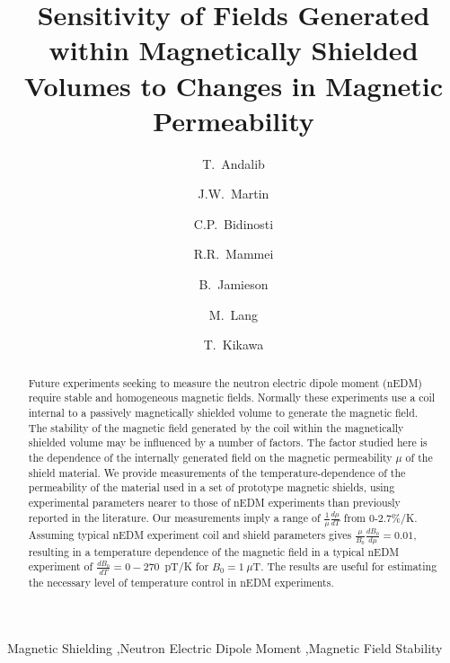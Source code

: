 \documentclass[review]{elsarticle}
\begin{document}
\begin{frontmatter}

\title{Sensitivity of Fields Generated within Magnetically Shielded
  Volumes to Changes in Magnetic Permeability}

\author[manitoba]{T.~Andalib}
\author[winnipeg,manitoba]{J.W.~Martin}
\author[winnipeg,manitoba]{C.P.~Bidinosti}
\author[winnipeg,manitoba]{R.R.~Mammei}
\author[winnipeg,manitoba]{B.~Jamieson}
\author[manitoba]{M.~Lang}
\author[triumf]{T.~Kikawa}


\address[winnipeg]{Physics Department, The University of Winnipeg, 515 Portage Avenue, Winnipeg, MB, R3B 2E9, Canada}
\address[manitoba]{Department of Physics and Astronomy, University of Manitoba, Winnipeg, MB R3T 2N2, Canada}
\address[triumf]{TRIUMF, 4004 Wesbrook Mall, Vancouver, BC V6T 2A3, Canada}


\begin{abstract}
Future experiments seeking to measure the neutron electric dipole
moment (nEDM) require stable and homogeneous magnetic fields.
Normally these experiments use a coil internal to a passively
magnetically shielded volume to generate the magnetic field.  The
stability of the magnetic field generated by the coil within the
magnetically shielded volume may be influenced by a number of factors.
The factor studied here is the dependence of the internally generated
field on the magnetic permeability $\mu$ of the shield material.  We
provide measurements of the temperature-dependence of the permeability
of the material used in a set of prototype magnetic shields, using
experimental parameters nearer to those of nEDM experiments than
previously reported in the literature.  Our measurements imply a range
of $\frac{1}{\mu}\frac{d\mu}{dT}$ from 0-2.7\%/K. Assuming typical
nEDM experiment coil and shield parameters gives
$\frac{\mu}{B_0}\frac{dB_0}{d\mu}=0.01$, resulting in a temperature
dependence of the magnetic field in a typical nEDM experiment of
$\frac{dB_0}{dT}=0-270$~pT/K for $B_0=1~\mu$T.  The results are useful
for estimating the necessary level of temperature control in nEDM
experiments.
\end{abstract}

\begin{keyword}
Magnetic Shielding \sep Neutron Electric Dipole Moment \sep Magnetic Field Stability
\end{keyword}

\end{frontmatter}
\end{document}
